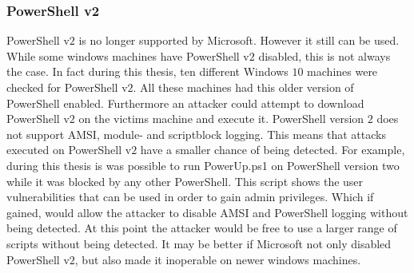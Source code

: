 \documentclass{article}%
\begin{document}
\subsubsection{PowerShell v2}
PowerShell v$2$ is no longer supported by Microsoft. However it still can be used. While some windows machines have PowerShell v$2$ disabled, this is not always the case. In fact during this thesis, ten different Windows $10$ machines were checked for PowerShell v$2$. All these machines had this older version of PowerShell enabled. Furthermore an attacker could attempt to download PowerShell v$2$ on the victims machine and execute it. PowerShell version $2$ does not support AMSI, module- and scriptblock logging. This means that attacks executed on PowerShell v$2$ have a smaller chance of being detected. For example, during this thesis is was possible to run PowerUp.ps1 on PowerShell version two while it was blocked by any other PowerShell. This script shows the user vulnerabilities that can be used in order to gain admin privileges. Which if gained, would allow the attacker to disable AMSI and PowerShell logging without being detected. At this point the attacker would be free to use a larger range of scripts without being detected. It may be better if Microsoft not only disabled PowerShell v$2$, but also made it inoperable on newer windows machines. 
\end{document}
